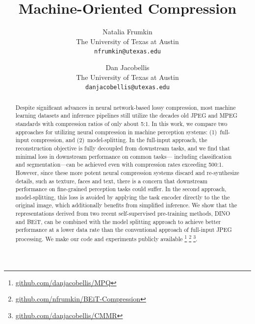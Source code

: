 \documentclass[10pt,twocolumn,letterpaper]{article}
\begin{document}
\title{Machine-Oriented Compression}

\author{Natalia Frumkin\\
The University of Texas at Austin\\
{\tt\small nfrumkin@utexas.edu}
\and
Dan Jacobellis\\
The University of Texas at Austin\\
{\tt\small danjacobellis@utexas.edu}
}

\maketitle


\begin{abstract}
Despite significant advances in neural network-based lossy compression, most machine learning datasets and inference pipelines still utilize the decades old JPEG and MPEG standards with compression ratios of only about 5:1.  In this work, we compare two approaches for utilizing neural compression in machine perception systems: (1)~full-input compression, and (2)~model-splitting. In the full-input approach, the reconstruction objective is fully decoupled from downstream tasks, and we find that minimal loss in downstream performance on common tasks--- including classification and segmentation---can be achieved even with compression rates exceeding 500:1. However, since these more potent neural compression systems discard and re-synthesize details, such as texture, faces and text, there is a concern that downstream performance on fine-grained perception tasks could suffer. In the second approach, model-splitting, this loss is avoided by applying the task encoder directly to the the original image, which additionally benefits from simplified inference. We show that the representations derived from two recent self-supervised pre-training methods, DINO and BEiT, can be combined with the model splitting approach to achieve better performance at a lower data rate than the conventional approach of full-input JPEG processing. We make our code and experiments publicly available
\footnote{\href{https://github.com/danjacobellis/MPQ}{github.com/danjacobellis/MPQ}}
\footnote{\href{https://github.com/nfrumkin/BEiT-compression}{github.com/nfrumkin/BEiT-Compression}}
\footnote{\href{https://github.com/danjacobellis/CMMR}{github.com/danjacobellis/CMMR}}.

\end{abstract}
\end{document}

